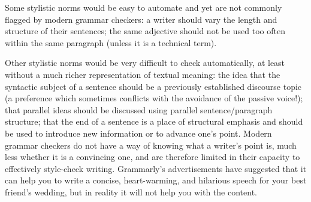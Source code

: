 Some stylistic norms  would be easy to automate and yet are not commonly flagged by modern grammar checkers:  a writer should vary the length and structure of their sentences; the same adjective should not be used too often within the same paragraph (unless it is a technical term).

Other stylistic norms would be very difficult to check automatically, at least without a much richer representation of textual meaning: the idea that the syntactic subject of a sentence should be a previously established discourse topic (a preference which sometimes conflicts with the avoidance of the passive voice!);
that parallel ideas should be discussed using parallel sentence/paragraph structure; that the end of a sentence is a place of structural emphasis and should be used to  introduce new information or to advance one's point.  Modern grammar checkers do not have a way of knowing what a writer's point is, much less whether it is a convincing one, and are therefore limited in their capacity to effectively style-check writing.
Grammarly's advertisements have suggested that it can help you to write a concise, heart-warming, and hilarious speech for your best friend's wedding, but in reality it will not help you with the content.








